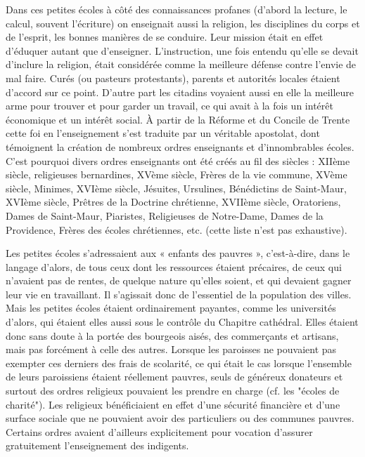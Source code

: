  Dans ces petites écoles à côté des connaissances profanes (d'abord la lecture, le calcul, souvent l'écriture) on enseignait aussi la religion, les disciplines du corps et de l'esprit, les bonnes manières de se conduire. Leur mission était en effet d'éduquer autant que d'enseigner. L'instruction, une fois entendu qu'elle se devait d'inclure la religion, était considérée comme la meilleure défense contre l'envie de mal faire. Curés (ou pasteurs protestants), parents et autorités locales étaient d'accord sur ce point. D'autre part les citadins voyaient aussi en elle la meilleure arme pour trouver et pour garder un travail, ce qui avait à la fois un intérêt économique et un intérêt social. À partir de la Réforme et du Concile de Trente cette foi en l'enseignement s'est traduite par un véritable apostolat, dont témoignent la création de nombreux ordres enseignants et d'innombrables écoles. C'est pourquoi divers ordres enseignants ont été créés au fil des siècles : XIIème siècle, religieuses bernardines, XVème siècle, Frères de la vie commune, XVème siècle, Minimes, XVIème siècle, Jésuites, Ursulines, Bénédictins de Saint-Maur, XVIème siècle, Prêtres de la Doctrine chrétienne, XVIIème siècle, Oratoriens, Dames de Saint-Maur, Piaristes, Religieuses de Notre-Dame, Dames de la Providence, Frères des écoles chrétiennes, etc. (cette liste n'est pas exhaustive). 

 Les petites écoles s'adressaient aux « enfants des pauvres », c'est-à-dire, dans le langage d'alors, de tous ceux dont les ressources étaient précaires, de ceux qui n'avaient pas de rentes, de quelque nature qu'elles soient, et qui devaient gagner leur vie en travaillant. Il s'agissait donc de l'essentiel de la population des villes. Mais les petites écoles étaient ordinairement payantes, comme les universités d'alors, qui étaient elles aussi sous le contrôle du Chapitre cathédral. Elles étaient donc sans doute à la portée des bourgeois aisés, des commerçants et artisans, mais pas forcément à celle des autres. Lorsque les paroisses ne pouvaient pas exempter ces derniers des frais de scolarité, ce qui était le cas lorsque l'ensemble de leurs paroissiens étaient réellement pauvres, seuls de généreux donateurs et surtout des ordres religieux pouvaient les prendre en charge (cf.  les "écoles de charité"). Les religieux bénéficiaient en effet d'une sécurité financière et d'une surface sociale que ne pouvaient avoir des particuliers ou des communes pauvres. Certains ordres avaient d'ailleurs explicitement pour vocation d'assurer gratuitement l'enseignement des indigents. 

